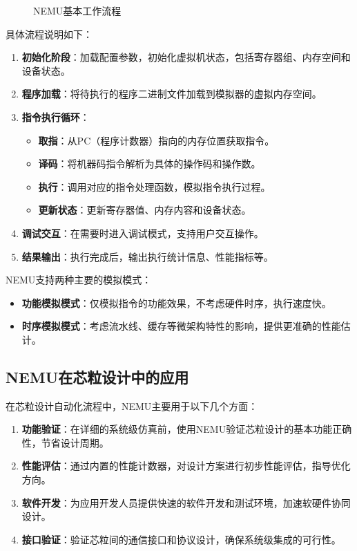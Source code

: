\documentclass[bachelor]{thesis-uestc}
\begin{document}
\begin{figure}[h]
    \caption{NEMU基本工作流程}
    \label{pic21}
\end{figure}

具体流程说明如下：
\begin{enumerate}
    \item \textbf{初始化阶段}：加载配置参数，初始化虚拟机状态，包括寄存器组、内存空间和设备状态。
    \item \textbf{程序加载}：将待执行的程序二进制文件加载到模拟器的虚拟内存空间。
    \item \textbf{指令执行循环}：
    \begin{itemize}
        \item \textbf{取指}：从PC（程序计数器）指向的内存位置获取指令。
        \item \textbf{译码}：将机器码指令解析为具体的操作码和操作数。
        \item \textbf{执行}：调用对应的指令处理函数，模拟指令执行过程。
        \item \textbf{更新状态}：更新寄存器值、内存内容和设备状态。
    \end{itemize}
    \item \textbf{调试交互}：在需要时进入调试模式，支持用户交互操作。
    \item \textbf{结果输出}：执行完成后，输出执行统计信息、性能指标等。
\end{enumerate}

NEMU支持两种主要的模拟模式：
\begin{itemize}
    \item \textbf{功能模拟模式}：仅模拟指令的功能效果，不考虑硬件时序，执行速度快。
    \item \textbf{时序模拟模式}：考虑流水线、缓存等微架构特性的影响，提供更准确的性能估计。
\end{itemize}

\subsection{NEMU在芯粒设计中的应用}
在芯粒设计自动化流程中，NEMU主要用于以下几个方面：

\begin{enumerate}
    \item \textbf{功能验证}：在详细的系统级仿真前，使用NEMU验证芯粒设计的基本功能正确性，节省设计周期。
    \item \textbf{性能评估}：通过内置的性能计数器，对设计方案进行初步性能评估，指导优化方向。
    \item \textbf{软件开发}：为应用开发人员提供快速的软件开发和测试环境，加速软硬件协同设计。
    \item \textbf{接口验证}：验证芯粒间的通信接口和协议设计，确保系统级集成的可行性。
\end{enumerate}
\end{document}
